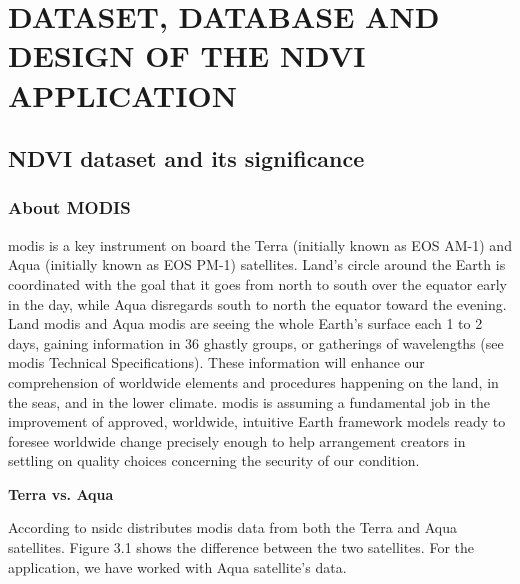 \chapter{DATASET, DATABASE AND DESIGN OF THE NDVI APPLICATION}
\label{chap:dataset & database}

\section{NDVI dataset and its significance}

\subsection{About MODIS}

\newcommand{\MYhref}[3][blue]{\href{#2}{\color{#1}{#3}}}%

\centerline{\MYhref{https://modis.gsfc.nasa.gov/}{NASA's MODIS website}}

\gls{modis} is a key instrument on board the Terra (initially known as EOS AM-1) and Aqua (initially known as EOS PM-1) satellites. Land's circle around the Earth is coordinated with the goal that it goes from north to south over the equator early in the day, while Aqua disregards south to north the equator toward the evening. Land \gls{modis} and Aqua \gls{modis} are seeing the whole Earth's surface each 1 to 2 days, gaining information in 36 ghastly groups, or gatherings of wavelengths (see \gls{modis} Technical Specifications). These information will enhance our comprehension of worldwide elements and procedures happening on the land, in the seas, and in the lower climate. \gls{modis} is assuming a fundamental job in the improvement of approved, worldwide, intuitive Earth framework models ready to foresee worldwide change precisely enough to help arrangement creators in settling on quality choices concerning the security of our condition. \cite{MODIS} \\

\centerline{\textbf{Terra vs. Aqua}}

According to \gls{nsidc} distributes \gls{modis} data from both the Terra and Aqua satellites. Figure 3.1 shows the difference between the two satellites. For the application, we have worked with Aqua satellite's data.

